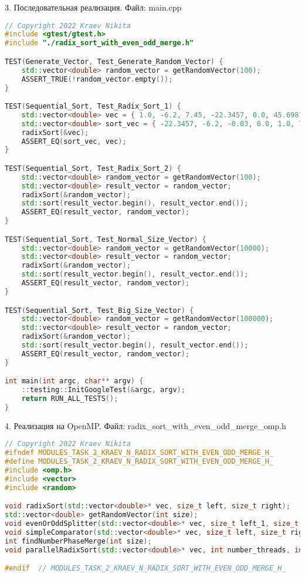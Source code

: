 \documentclass{report}
\begin{document}
\par 3. Последовательная реализация. Файл: main.cpp

\begin{lstlisting}[language=C++]
// Copyright 2022 Kraev Nikita
#include <gtest/gtest.h>
#include "./radix_sort_with_even_odd_merge.h"

TEST(Generate_Vector, Test_Generate_Random_Vector) {
    std::vector<double> random_vector = getRandomVector(100);
    ASSERT_TRUE(!random_vector.empty());
}

TEST(Sequential_Sort, Test_Radix_Sort_1) {
    std::vector<double> vec = { 1.0, -6.2, 7.45, -22.3457, 0.0, 45.69876, -0.03 };
    std::vector<double> sort_vec = { -22.3457, -6.2, -0.03, 0.0, 1.0, 7.45, 45.69876 };
    radixSort(&vec);
    ASSERT_EQ(sort_vec, vec);
}

TEST(Sequential_Sort, Test_Radix_Sort_2) {
    std::vector<double> random_vector = getRandomVector(100);
    std::vector<double> result_vector = random_vector;
    radixSort(&random_vector);
    std::sort(result_vector.begin(), result_vector.end());
    ASSERT_EQ(result_vector, random_vector);
}

TEST(Sequential_Sort, Test_Normal_Size_Vector) {
    std::vector<double> random_vector = getRandomVector(10000);
    std::vector<double> result_vector = random_vector;
    radixSort(&random_vector);
    std::sort(result_vector.begin(), result_vector.end());
    ASSERT_EQ(result_vector, random_vector);
}

TEST(Sequential_Sort, Test_Big_Size_Vector) {
    std::vector<double> random_vector = getRandomVector(100000);
    std::vector<double> result_vector = random_vector;
    radixSort(&random_vector);
    std::sort(result_vector.begin(), result_vector.end());
    ASSERT_EQ(result_vector, random_vector);
}

int main(int argc, char** argv) {
    ::testing::InitGoogleTest(&argc, argv);
    return RUN_ALL_TESTS();
}
\end{lstlisting}

\par 4. Реализация на OpenMP. Файл: radix\_sort\_with\_even\_odd\_merge\_omp.h

\begin{lstlisting}[language=C++]
// Copyright 2022 Kraev Nikita
#ifndef MODULES_TASK_2_KRAEV_N_RADIX_SORT_WITH_EVEN_ODD_MERGE_H_
#define MODULES_TASK_2_KRAEV_N_RADIX_SORT_WITH_EVEN_ODD_MERGE_H_
#include <omp.h>
#include <vector>
#include <random>

void radixSort(std::vector<double>* vec, size_t left, size_t right);
std::vector<double> getRandomVector(int size);
void evenOrOddSplitter(std::vector<double>* vec, size_t left_1, size_t right_1, size_t left_2, size_t right_2, bool check);
void simpleComparator(std::vector<double>* vec, size_t left, size_t right);
int findNumberPhaseMerge(int size);
void parallelRadixSort(std::vector<double>* vec, int number_threads, int size);

#endif  // MODULES_TASK_2_KRAEV_N_RADIX_SORT_WITH_EVEN_ODD_MERGE_H_
\end{lstlisting}
\end{document}
